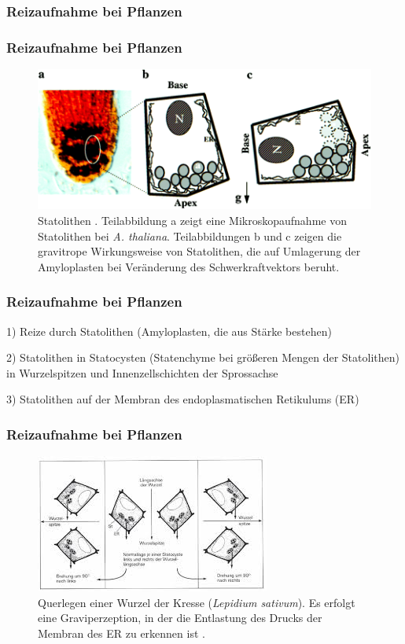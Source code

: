 \documentclass[aspectratio=169]{beamer}
\begin{document}
	\subsubsection{Reizaufnahme bei Pflanzen}
		
	\begin{frame}
		\frametitle{Reizaufnahme bei Pflanzen}
		\begin{figure}[H]
			\centering 
			\includegraphics[width = 0.75\linewidth]{images/Statolithen2.png}
			\caption{Statolithen \parencite[345]{Chen1999}. Teilabbildung a zeigt eine Mikroskopaufnahme von Statolithen bei \emph{A. thaliana}. Teilabbildungen b und c zeigen die gravitrope Wirkungsweise von Statolithen, die auf Umlagerung der Amyloplasten bei Veränderung des Schwerkraftvektors beruht. \label{Statolithen}}
		\end{figure} 
	\end{frame}

\begin{frame}
\frametitle{Reizaufnahme bei Pflanzen}

1) Reize durch Statolithen (Amyloplasten, die aus Stärke bestehen)

2) Statolithen in Statocysten (Statenchyme bei größeren Mengen der Statolithen) in Wurzelspitzen und Innenzellschichten der Sprossachse

3) Statolithen auf der Membran des endoplasmatischen Retikulums (ER)

\end{frame}

\begin{frame}
\frametitle{Reizaufnahme bei Pflanzen}

 \begin{figure}[H]
	\centering 
	\includegraphics[width = 0.55\linewidth]{images/Graviperzeption.jpeg}
	\caption{Querlegen einer Wurzel der Kresse (\emph{Lepidium sativum}). Es erfolgt eine Graviperzeption, in der die Entlastung des Drucks der Membran des ER zu erkennen ist \parencite[533]{Luettge}. \label{Graviperzeption}}
\end{figure} 

\end{frame}
			
\end{document}

